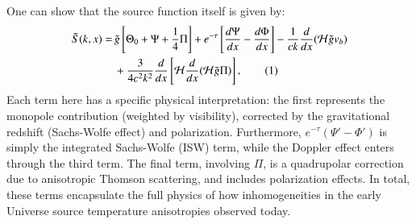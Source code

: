 \documentclass{aa}
\newcommand\numberthis{\addtocounter{equation}{1}\tag{\theequation}}
\numberwithin{equation}{section}
\numberwithin{table}{section}
\numberwithin{figure}{section}
\begin{document}
One can show that the source function itself is given by:
\begin{align*}
\tilde{S}(k, x) =\, &\tilde{g} \left[ \Theta_0 + \Psi + \frac{1}{4} \Pi \right] + e^{-\tau} \left[\frac{d\Psi}{dx} - \frac{d\Phi}{dx}\right] - \frac{1}{ck} \frac{d}{dx}(\mathcal{H} \tilde{g} v_b) \\
&+ \frac{3}{4 c^2 k^2} \frac{d}{dx} \left[ \mathcal{H} \frac{d}{dx} (\mathcal{H} \tilde{g} \Pi) \right], \numberthis \label{eq: source}
\end{align*}
Each term here has a specific physical interpretation: the first represents the monopole contribution (weighted by visibility), corrected by the gravitational redshift (Sachs-Wolfe effect) and polarization. Furthermore, $e^{-\tau}(\Psi' - \Phi')$ is simply the integrated Sachs-Wolfe (ISW) term, while the Doppler effect enters through the third term. The final term, involving $\Pi$, is a quadrupolar correction due to anisotropic Thomson scattering, and includes polarization effects. In total, these terms encapsulate the full physics of how inhomogeneities in the early Universe source temperature anisotropies observed today. 
\end{document}
